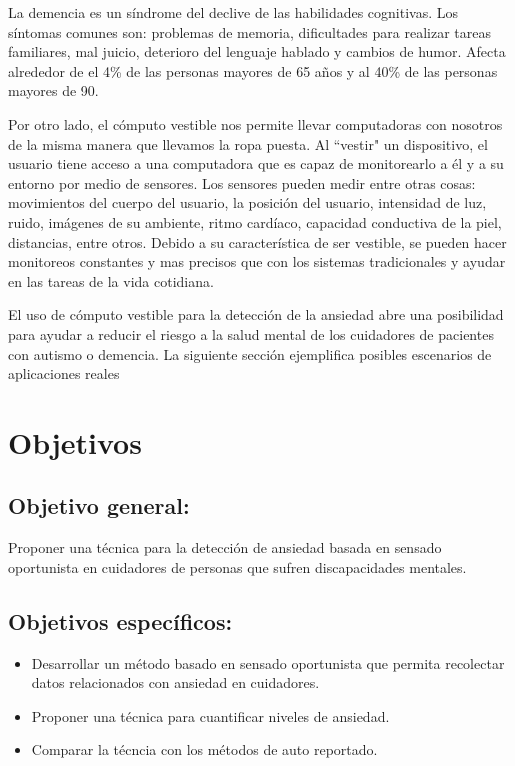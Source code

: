 \documentclass[letterpaper,12pt]{cicese}
\begin{document}
La demencia es un s\'indrome del declive de las habilidades cognitivas. Los s\'intomas comunes son: problemas de memoria, dificultades para realizar tareas familiares, mal juicio, deterioro del lenguaje hablado y cambios de humor\citep{Aziz}. Afecta alrededor de el 4\% de las personas mayores de 65 a\~nos y al 40\% de las personas mayores de 90.

                        Por otro lado, el c\'omputo vestible nos permite llevar computadoras con nosotros de la misma manera que llevamos la ropa puesta. Al ``vestir" un dispositivo,
                        el usuario tiene acceso a una computadora que es capaz de monitorearlo a \'el y a su entorno por medio de sensores. Los sensores pueden medir entre
                        otras cosas: movimientos del cuerpo del usuario, la posici\'on del usuario, intensidad de luz, ruido, im\'agenes de su ambiente, ritmo card\'iaco, capacidad
                        conductiva de la piel, distancias, entre otros. Debido a su caracter\'istica de ser vestible, se pueden hacer monitoreos constantes y mas precisos que con
                        los sistemas tradicionales y ayudar en las tareas de la vida cotidiana.

                        El uso de c\'omputo vestible para la detecci\'on de la ansiedad abre una posibilidad para ayudar a reducir el riesgo a la salud mental
                        de los cuidadores de pacientes con autismo o demencia. La siguiente secci\'on ejemplifica posibles escenarios de aplicaciones reales

	\chapter{Objetivos}
		
	\section{\textbf{Objetivo general:}}
			Proponer una t\'ecnica para la detecci\'on de ansiedad basada en sensado oportunista en cuidadores de personas que sufren discapacidades mentales.
	\section{\textbf{Objetivos espec\'ificos:}}
		\begin{itemize}
			\item Desarrollar un m\'etodo basado en sensado oportunista que permita recolectar datos relacionados con ansiedad en cuidadores.
			\item Proponer una t\'ecnica para cuantificar niveles de ansiedad.
			\item Comparar la t\'ecncia con los m\'etodos de auto reportado.
		\end{itemize}
\end{document}
